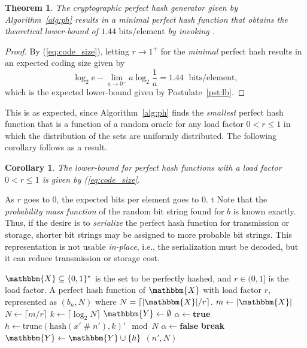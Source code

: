 \documentclass[hidelinks,11pt,final]{article}
\newcommand{\envnumstyle}{section}
\theoremstyle{plain}
\newtheorem{theorem}{Theorem}[\envnumstyle]
\newtheorem{corollary}{Corollary}[theorem]
\newcommand{\cat}{\mathbin{\#}}
\newcommand{\Break}{\textbf{break}}
\newcommand{\True}{\textbf{true}}
\newcommand{\False}{\textbf{false}}
\begin{document}
\begin{theorem}
The cryptographic perfect hash generator given by Algorithm~\ref{alg:ph} results in a \emph{minimal} perfect hash function that obtains the theoretical lower-bound of $1.44\text{ bits/element}$ by invoking .
\end{theorem}
\begin{proof}
By (\ref{eq:code_size}), letting $r \to 1^{+}$ for the \emph{minimal} perfect hash results in an expected coding size given by
\begin{equation}
    \log_2 \mathrm{e} - \lim_{a \to 0^{-}} a \log_2 \frac{1}{a} = 1.44 \; \text{ bits/element},
\end{equation}
which is the expected lower-bound given by Postulate~\ref{pst:lb}.
\end{proof}
This is as expected, since Algorithm~\ref{alg:ph} finds the \emph{smallest} perfect hash function that is a function of a random oracle for any load factor $0 < r \leq 1$ in which the distribution of the sets are uniformly distributed. The following corollary follows as a result.
\begin{corollary}
The lower-bound for perfect hash functions with a load factor $0 < r \leq 1$ is given by (\ref{eq:code_size}.
\end{corollary}
As $r$ goes to $0$, the expected bits per element goes to $0$.
t
Note that the \emph{probability mass function} of the random bit string found for $b$ is known exactly. Thus, if the desire is to \emph{serialize} the perfect hash function for transmission or storage, shorter bit strings may be assigned to more probable bit strings. This representation is not usable \emph{in-place}, i.e., the serialization must be decoded, but it can reduce transmission or storage cost.

\begin{algorithm}
	\caption{Cryptographic perfect hash function constructor (single-level)}
	\label{alg:ph}
	\KwIn
	{
		$\mathbbm{X} \subseteq \{0,1\}^*$ is the set to be perfectly hashed, and
		$r \in (0,1]$ is the load factor.
	}
	\KwOut
	{
		A perfect hash function of $\mathbbm{X}$ with load factor $r$, represented as $(b_n, N)$ where $N = \lceil |\mathbbm{X}|/r \rceil$.
	}
	{
		$m \gets |\mathbbm{X}|$\;
		$N \gets \lceil m / r \rceil$\;
		$k \gets \lceil\log_2 N\rceil$\;
		{
			$\mathbbm{Y} \gets \emptyset$\;
			$\alpha \gets \True$\;
			{
				$h \gets \mathrm{trunc}\!\left(\mathrm{hash}(x' \cat n'),k\right)' \mod N$\;
				{
					$\alpha \gets \False$\;
					\Break\;
				}
				$\mathbbm{Y} \gets \mathbbm{Y} \cup \{h\}$\;
			}
			\If{$\alpha$}
			{
				\Return $(n', N)$\;
			}
		}
	}
\end{algorithm}
\end{document}
